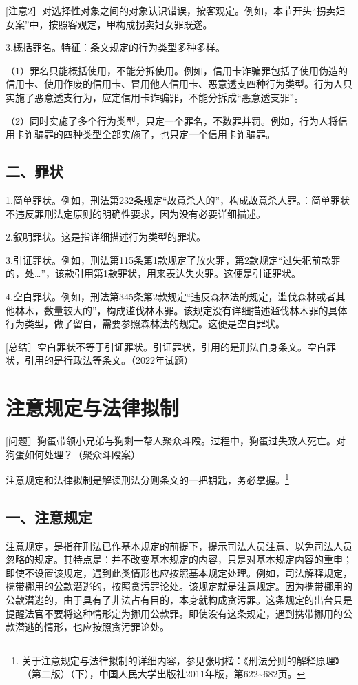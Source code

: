 [注意2］对选择性对象之间的对象认识错误，按客观定。例如，本节开头“拐卖妇女案”中，按照客观定，甲构成拐卖妇女罪既遂。

3.概括罪名。特征：条文规定的行为类型多种多样。

（1）罪名只能概括使用，不能分拆使用。例如，信用卡诈骗罪包括了使用伪造的信用卡、使用作废的信用卡、冒用他人信用卡、恶意透支四种行为类型。行为人只实施了恶意透支行为，应定信用卡诈骗罪，不能分拆成“恶意透支罪”。

（2）同时实施了多个行为类型，只定一个罪名，不数罪并罚。例如，行为人将信用卡诈骗罪的四种类型全部实施了，也只定一个信用卡诈骗罪。

\subsection*{二、罪状}

1.简单罪状。例如，刑法第232条规定“故意杀人的”，构成故意杀人罪。：简单罪状不违反罪刑法定原则的明确性要求，因为没有必要详细描述。

2.叙明罪状。这是指详细描述行为类型的罪状。

3.引证罪状。例如，刑法第115条第1款规定了放火罪，第2款规定“过失犯前款罪的，处…”，该款引用第1款罪状，用来表达失火罪。这便是引证罪状。

4.空白罪状。例如，刑法第345条第2款规定“违反森林法的规定，滥伐森林或者其他林木，数量较大的”，构成滥伐林木罪。该规定没有详细描述滥伐林木罪的具体行为类型，做了留白，需要参照森林法的规定。这便是空白罪状。

[总结］空白罪状不等于引证罪状。引证罪状，引用的是刑法自身条文。空白罪状，引用的是行政法等条文。（2022年试题）

\section{注意规定与法律拟制}

[问题］狗蛋带领小兄弟与狗剩一帮人聚众斗殴。过程中，狗蛋过失致人死亡。对狗蛋如何处理？（聚众斗殴案）

注意规定和法律拟制是解读刑法分则条文的一把钥匙，务必掌握。\footnote{关于注意规定与法律拟制的详细内容，参见张明楷：《刑法分则的解释原理》（第二版）（下），中国人民大学出版社2011年版，第622\textasciitilde{}682页。}

\subsection*{一、注意规定}

注意规定，是指在刑法已作基本规定的前提下，提示司法人员注意、以免司法人员忽略的规定。其特点是：并不改变基本规定的内容，只是对基本规定内容的重申；即使不设置该规定，遇到此类情形也应按照基本规定处理。例如，司法解释规定，携带挪用的公款潜逃的，按照贪污罪论处。该规定就是注意规定。因为携带挪用的公款潜逃的，由于具有了非法占有目的，本身就构成贪污罪。这条规定的出台只是提醒法官不要将这种情形定为挪用公款罪。即使没有这条规定，遇到携带挪用的公款潜逃的情形，也应按照贪污罪论处。

